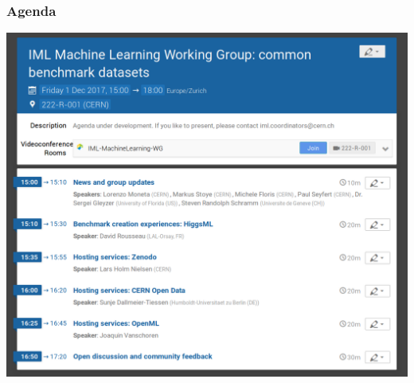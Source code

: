 \documentclass[table,xcolor=dvipsnames,professionalfonts]{beamer}
\begin{document}
\begin{frame}
  \frametitle{Agenda}
  \includegraphics[width=.8\textwidth]{./agenda.png}
\end{frame}
\end{document}
